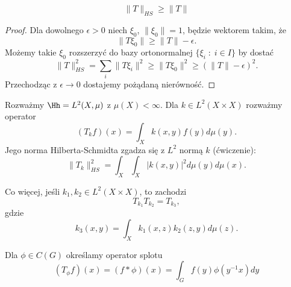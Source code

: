 \begin{lemma}{}{}
  $$\|T\|_{HS}\geq \|T\|$$
\end{lemma}

\begin{proof}
  Dla dowolnego $\epsilon>0$ niech $\xi_0$, $\|\xi_0\|=1$, będzie wektorem takim, że 
  $$\|T\xi_0\|\geq \|T\|-\epsilon.$$
  Możemy takie $\xi_0$ rozszerzyć do bazy ortonormalnej $\{\xi_i\;:\;i\in I\}$ by dostać
  $$\|T\|_{HS}^2=\sum_i\|T\xi_i\|^2\geq\|T\xi_0\|^2\geq (\|T\|-\epsilon)^2.$$
  Przechodząc z $\epsilon\to 0$ dostajemy pożądaną nierówność.
\end{proof}

\begin{example}[m]
  \item Rozważmy $\Hh=L^2(X,\mu)$ z $\mu(X)<\infty$. Dla $k\in L^2(X\times X)$ rozważmy operator
    $$(T_kf)(x)=\int_Xk(x,y)f(y)d\mu(y).$$
    Jego norma Hilberta-Schmidta zgadza się z $L^2$ normą $k$ (ćwiczenie):
    $$\|T_k\|^2_{HS}=\int_X\int_X |k(x,y)|^2 d\mu(y)d\mu(x).$$
    \bigskip 

    Co więcej, jeśli $k_1, k_2\in L^2(X\times X)$, to zachodzi
    $$T_{k_1}T_{k_2}=T_{k_3},$$
    gdzie
    $$k_3(x,y)=\int_X k_1(x,z)k_2(z,y)d\mu(z).$$
  \item Dla $\phi\in C(G)$ określamy operator splotu 
    $$(T_\phi f)(x)=(f\ast\phi)(x)=\int_G f(y)\phi(y^{-1}x)dy$$
\end{example}

%
%
%
%
%
%
%
%
%
%
%
%
%
